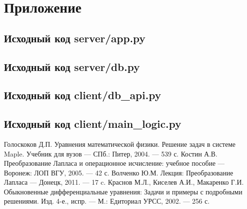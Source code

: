 \documentclass[14pt,a4paper,openbib]{extarticle}
\numberwithin{equation}{section}
\begin{document}
\newpage
\section{Приложение}
\subsection{Исходный код server/app.py}



\newpage
\subsection{Исходный код server/db.py}



% 


\newpage
\subsection{Исходный код client/db\_api.py}



\newpage
\subsection{Исходный код client/main\_logic.py}



\newpage
{}
\begin{thebibliography}{}
\bibitem{}
Голоскоков Д.П. Уравнения математической физики. Решение задач в системе Maple. Учебник для вузов --- СПб.: Питер, 2004. --- 539 с.
\bibitem{}
Костин А.В. Преобразование Лапласа и операционное исчисление: учебное пособие --- Воронеж: ЛОП ВГУ, 2005. --- 42 с.
\bibitem{}
Волченко Ю.М. Лекция: Преобразование Лапласа --- Донецк, 2011. --- 17 c.
\bibitem{}
Краснов М.Л., Киселев А.И., Макаренко Г.И. Обыкновенные дифференциальные уравнения: Задачи и примеры с подробными решениями.
Изд. 4-е., испр. --- М.: Едиториал УРСС, 2002. --- 256 с.
\end{thebibliography}
\end{document}
